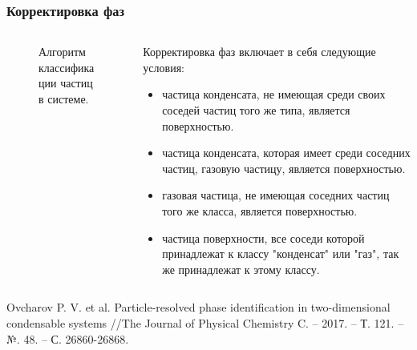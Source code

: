 \documentclass[pdf,hyperref={unicode}]{beamer}
\begin{document}
\begin{frame}
\transdissolve[duration=0.2]
\frametitle{Корректировка фаз}
\begin{columns}

\begin{column}{0.47\linewidth}

\begin{figure}[h]
\caption{\tiny Алгоритм классификации частиц в системе.}
\end{figure}

\end{column}

\begin{column}{0.47\linewidth}
\tiny{
Корректировка фаз включает в себя следующие условия:
\begin{itemize}
\item частица конденсата, не имеющая среди своих соседей частиц того же типа, является поверхностью.
\item частица конденсата, которая имеет среди соседних частиц, газовую частицу, является поверхностью.
\item газовая частица, не имеющая соседних частиц того же класса,  является поверхностью.
\item частица поверхности, все соседи которой принадлежат к классу "конденсат" или "газ", так же принадлежат к этому классу.
\end{itemize}
}
\end{column}

\end{columns}

\vspace{12mm}
\tiny{
Ovcharov P. V. et al. Particle-resolved phase identification in two-dimensional condensable systems //The Journal of Physical Chemistry C. – 2017. – Т. 121. – №. 48. – С. 26860-26868.
}
\end{frame}
\end{document}
